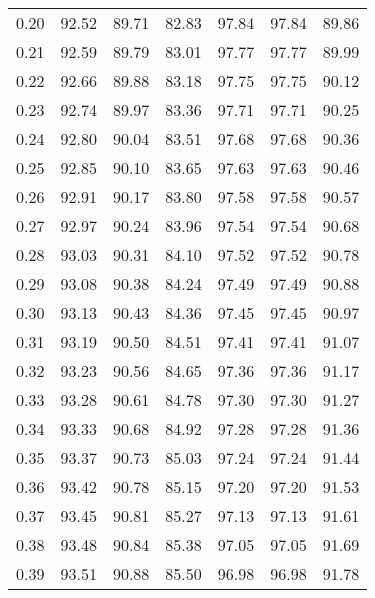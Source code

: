 \begin{tabular}{|c|c|c|c|c|c|c|}
      0.20 &     92.52 &     89.71 &      82.83 &   97.84 &      97.84 &         89.86 \\
      0.21 &     92.59 &     89.79 &      83.01 &   97.77 &      97.77 &         89.99 \\
      0.22 &     92.66 &     89.88 &      83.18 &   97.75 &      97.75 &         90.12 \\
      0.23 &     92.74 &     89.97 &      83.36 &   97.71 &      97.71 &         90.25 \\
      0.24 &     92.80 &     90.04 &      83.51 &   97.68 &      97.68 &         90.36 \\
      0.25 &     92.85 &     90.10 &      83.65 &   97.63 &      97.63 &         90.46 \\
      0.26 &     92.91 &     90.17 &      83.80 &   97.58 &      97.58 &         90.57 \\
      0.27 &     92.97 &     90.24 &      83.96 &   97.54 &      97.54 &         90.68 \\
      0.28 &     93.03 &     90.31 &      84.10 &   97.52 &      97.52 &         90.78 \\
      0.29 &     93.08 &     90.38 &      84.24 &   97.49 &      97.49 &         90.88 \\
      0.30 &     93.13 &     90.43 &      84.36 &   97.45 &      97.45 &         90.97 \\
      0.31 &     93.19 &     90.50 &      84.51 &   97.41 &      97.41 &         91.07 \\
      0.32 &     93.23 &     90.56 &      84.65 &   97.36 &      97.36 &         91.17 \\
      0.33 &     93.28 &     90.61 &      84.78 &   97.30 &      97.30 &         91.27 \\
      0.34 &     93.33 &     90.68 &      84.92 &   97.28 &      97.28 &         91.36 \\
      0.35 &     93.37 &     90.73 &      85.03 &   97.24 &      97.24 &         91.44 \\
      0.36 &     93.42 &     90.78 &      85.15 &   97.20 &      97.20 &         91.53 \\
      0.37 &     93.45 &     90.81 &      85.27 &   97.13 &      97.13 &         91.61 \\
      0.38 &     93.48 &     90.84 &      85.38 &   97.05 &      97.05 &         91.69 \\
      0.39 &     93.51 &     90.88 &      85.50 &   96.98 &      96.98 &         91.78 \\

\end{tabular}
